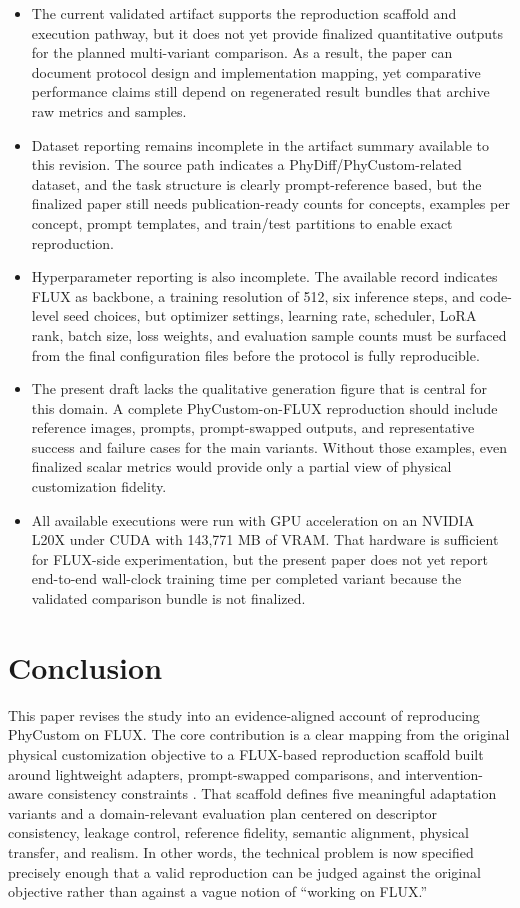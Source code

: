 \documentclass{article}
\begin{document}
\begin{itemize}
    \item The current validated artifact supports the reproduction scaffold and execution pathway, but it does not yet provide finalized quantitative outputs for the planned multi-variant comparison. As a result, the paper can document protocol design and implementation mapping, yet comparative performance claims still depend on regenerated result bundles that archive raw metrics and samples.
    \item Dataset reporting remains incomplete in the artifact summary available to this revision. The source path indicates a PhyDiff/PhyCustom-related dataset, and the task structure is clearly prompt-reference based, but the finalized paper still needs publication-ready counts for concepts, examples per concept, prompt templates, and train/test partitions to enable exact reproduction.
    \item Hyperparameter reporting is also incomplete. The available record indicates FLUX as backbone, a training resolution of 512, six inference steps, and code-level seed choices, but optimizer settings, learning rate, scheduler, LoRA rank, batch size, loss weights, and evaluation sample counts must be surfaced from the final configuration files before the protocol is fully reproducible.
    \item The present draft lacks the qualitative generation figure that is central for this domain. A complete PhyCustom-on-FLUX reproduction should include reference images, prompts, prompt-swapped outputs, and representative success and failure cases for the main variants. Without those examples, even finalized scalar metrics would provide only a partial view of physical customization fidelity.
    \item All available executions were run with GPU acceleration on an NVIDIA L20X under CUDA with 143{,}771 MB of VRAM. That hardware is sufficient for FLUX-side experimentation, but the present paper does not yet report end-to-end wall-clock training time per completed variant because the validated comparison bundle is not finalized.
\end{itemize}

\FloatBarrier
\section{Conclusion}

This paper revises the study into an evidence-aligned account of reproducing PhyCustom on FLUX. The core contribution is a clear mapping from the original physical customization objective to a FLUX-based reproduction scaffold built around lightweight adapters, prompt-swapped comparisons, and intervention-aware consistency constraints \cite{wu2025phycustom,blackforestlabs2024fluxdev,hu2021lora}. That scaffold defines five meaningful adaptation variants and a domain-relevant evaluation plan centered on descriptor consistency, leakage control, reference fidelity, semantic alignment, physical transfer, and realism. In other words, the technical problem is now specified precisely enough that a valid reproduction can be judged against the original objective rather than against a vague notion of ``working on FLUX.''
\end{document}
